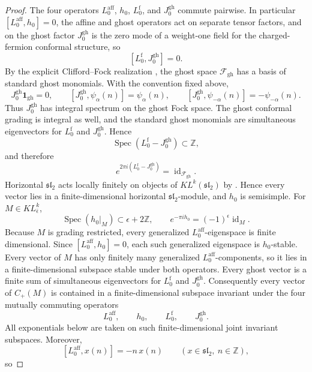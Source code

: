 \documentclass[12pt,leqno]{amsart}
\numberwithin{equation}{section}
\newcommand{\one}{\mathbf{1}}
\newcommand{\id}{\operatorname{id}}
\newcommand{\KL}{KL}
\def\Z{\mathbb{Z}}
\begin{document}
\begin{proof}
The four operators
$L^{\mathrm{aff}}_0$, $h_0$, $L^{\mathrm f}_0$, and
$J^{\mathrm{gh}}_0$ commute pairwise.  In particular
$[L^{\mathrm{aff}}_0,h_0]=0$, the affine and ghost operators act on
separate tensor factors, and on the ghost factor $J^{\mathrm{gh}}_0$ is
the zero mode of a weight-one field for the charged-fermion conformal
structure, so
\[
 [L^{\mathrm f}_0,J^{\mathrm{gh}}_0]=0.
\]  By the explicit Clifford--Fock realization
\cite[(154)--(159)]{ArakawaW}, the ghost space
$\mathcal F_{\mathrm{gh}}$ has a basis of standard ghost monomials.  With
the convention fixed above,
\[
 J^{\mathrm{gh}}_0\one_{\mathrm{gh}}=0,
 \qquad
 [J^{\mathrm{gh}}_0,\psi_\alpha(n)]=\psi_\alpha(n),
 \qquad
 [J^{\mathrm{gh}}_0,\psi_{-\alpha}(n)]=-\psi_{-\alpha}(n).
\]
Thus $J^{\mathrm{gh}}_0$ has integral spectrum on the ghost Fock space.
The ghost conformal grading is integral as well, and the standard ghost
monomials are simultaneous eigenvectors for $L^{\mathrm f}_0$ and
$J^{\mathrm{gh}}_0$.  Hence
\[
 \operatorname{Spec}(L^{\mathrm f}_0-J^{\mathrm{gh}}_0)\subset\Z,
\]
and therefore
\begin{equation}\label{eq:ghost-exponential}
 e^{2\pi i(L^{\mathrm f}_0-J^{\mathrm{gh}}_0)}
 =\id_{\mathcal F_{\mathrm{gh}}}.
\end{equation}
Horizontal $\mathfrak{sl}_2$ acts locally finitely on objects of
$\KL^k(\mathfrak{sl}_2)$ by \cite[Section~2]{McRaeYang}.  Hence every
vector lies in a finite-dimensional horizontal $\mathfrak{sl}_2$-module,
and $h_0$ is semisimple.  For
$M\in\KL^k_{\bar\epsilon}$,
\[
 \operatorname{Spec}(h_0|_M)\subset\epsilon+2\Z,
 \qquad
 e^{-\pi ih_0}=(-1)^\epsilon\id_M.
\]
Because $M$ is grading restricted, every generalized
$L^{\mathrm{aff}}_0$-eigenspace is finite dimensional.  Since
$[L^{\mathrm{aff}}_0,h_0]=0$, each such generalized eigenspace is
$h_0$-stable.  Every vector of $M$ has only finitely many generalized
$L^{\mathrm{aff}}_0$-components, so it lies in a finite-dimensional
subspace stable under both operators.  Every ghost vector is a finite sum
of simultaneous eigenvectors
for $L^{\mathrm f}_0$ and $J^{\mathrm{gh}}_0$.  Consequently every vector
of $C_+(M)$ is contained in a finite-dimensional subspace invariant under
the four mutually commuting operators
\[
 L^{\mathrm{aff}}_0,\qquad h_0,\qquad
 L^{\mathrm f}_0,\qquad J^{\mathrm{gh}}_0.
\]
All exponentials below are taken on such finite-dimensional joint invariant
subspaces.  Moreover,
\[
 [L^{\mathrm{aff}}_0,x(n)]=-n\,x(n)
 \qquad(x\in\mathfrak{sl}_2,\ n\in\Z),
\]
so

\end{proof}
\end{document}

